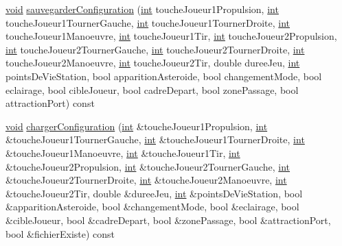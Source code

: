 \begin{DoxyCompactItemize}
\hyperlink{wglew_8h_aeea6e3dfae3acf232096f57d2d57f084}{void} \hyperlink{group__inf2990_ga2078e6964e0e3991cdc3926da825412d}{sauvegarder\-Configuration} (\hyperlink{wglew_8h_a500a82aecba06f4550f6849b8099ca21}{int} touche\-Joueur1\-Propulsion, \hyperlink{wglew_8h_a500a82aecba06f4550f6849b8099ca21}{int} touche\-Joueur1\-Tourner\-Gauche, \hyperlink{wglew_8h_a500a82aecba06f4550f6849b8099ca21}{int} touche\-Joueur1\-Tourner\-Droite, \hyperlink{wglew_8h_a500a82aecba06f4550f6849b8099ca21}{int} touche\-Joueur1\-Manoeuvre, \hyperlink{wglew_8h_a500a82aecba06f4550f6849b8099ca21}{int} touche\-Joueur1\-Tir, \hyperlink{wglew_8h_a500a82aecba06f4550f6849b8099ca21}{int} touche\-Joueur2\-Propulsion, \hyperlink{wglew_8h_a500a82aecba06f4550f6849b8099ca21}{int} touche\-Joueur2\-Tourner\-Gauche, \hyperlink{wglew_8h_a500a82aecba06f4550f6849b8099ca21}{int} touche\-Joueur2\-Tourner\-Droite, \hyperlink{wglew_8h_a500a82aecba06f4550f6849b8099ca21}{int} touche\-Joueur2\-Manoeuvre, \hyperlink{wglew_8h_a500a82aecba06f4550f6849b8099ca21}{int} touche\-Joueur2\-Tir, double duree\-Jeu, \hyperlink{wglew_8h_a500a82aecba06f4550f6849b8099ca21}{int} points\-De\-Vie\-Station, bool apparition\-Asteroide, bool changement\-Mode, bool eclairage, bool cible\-Joueur, bool cadre\-Depart, bool zone\-Passage, bool attraction\-Port) const 
\item 
\hyperlink{wglew_8h_aeea6e3dfae3acf232096f57d2d57f084}{void} \hyperlink{group__inf2990_ga74edda2c2220100dfa1a59b20291610b}{charger\-Configuration} (\hyperlink{wglew_8h_a500a82aecba06f4550f6849b8099ca21}{int} \&touche\-Joueur1\-Propulsion, \hyperlink{wglew_8h_a500a82aecba06f4550f6849b8099ca21}{int} \&touche\-Joueur1\-Tourner\-Gauche, \hyperlink{wglew_8h_a500a82aecba06f4550f6849b8099ca21}{int} \&touche\-Joueur1\-Tourner\-Droite, \hyperlink{wglew_8h_a500a82aecba06f4550f6849b8099ca21}{int} \&touche\-Joueur1\-Manoeuvre, \hyperlink{wglew_8h_a500a82aecba06f4550f6849b8099ca21}{int} \&touche\-Joueur1\-Tir, \hyperlink{wglew_8h_a500a82aecba06f4550f6849b8099ca21}{int} \&touche\-Joueur2\-Propulsion, \hyperlink{wglew_8h_a500a82aecba06f4550f6849b8099ca21}{int} \&touche\-Joueur2\-Tourner\-Gauche, \hyperlink{wglew_8h_a500a82aecba06f4550f6849b8099ca21}{int} \&touche\-Joueur2\-Tourner\-Droite, \hyperlink{wglew_8h_a500a82aecba06f4550f6849b8099ca21}{int} \&touche\-Joueur2\-Manoeuvre, \hyperlink{wglew_8h_a500a82aecba06f4550f6849b8099ca21}{int} \&touche\-Joueur2\-Tir, double \&duree\-Jeu, \hyperlink{wglew_8h_a500a82aecba06f4550f6849b8099ca21}{int} \&points\-De\-Vie\-Station, bool \&apparition\-Asteroide, bool \&changement\-Mode, bool \&eclairage, bool \&cible\-Joueur, bool \&cadre\-Depart, bool \&zone\-Passage, bool \&attraction\-Port, bool \&fichier\-Existe) const 

\end{DoxyCompactItemize}
